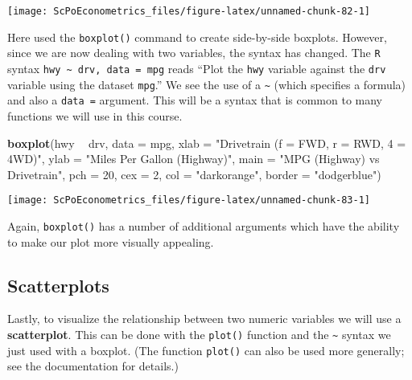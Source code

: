 \documentclass[]{book}
\newenvironment{Shaded}{\begin{snugshade}}{\end{snugshade}}
\newcommand{\DataTypeTok}[1]{\textcolor[rgb]{0.13,0.29,0.53}{#1}}
\newcommand{\DecValTok}[1]{\textcolor[rgb]{0.00,0.00,0.81}{#1}}
\newcommand{\KeywordTok}[1]{\textcolor[rgb]{0.13,0.29,0.53}{\textbf{#1}}}
\newcommand{\NormalTok}[1]{#1}
\newcommand{\OperatorTok}[1]{\textcolor[rgb]{0.81,0.36,0.00}{\textbf{#1}}}
\newcommand{\StringTok}[1]{\textcolor[rgb]{0.31,0.60,0.02}{#1}}
\begin{document}
\begin{center}\texttt{[image: ScPoEconometrics\_files/figure-latex/unnamed-chunk-82-1]} \end{center}

Here used the \texttt{boxplot()} command to create side-by-side boxplots. However, since we are now dealing with two variables, the syntax has changed. The \texttt{R} syntax \texttt{hwy\ \textasciitilde{}\ drv,\ data\ =\ mpg} reads ``Plot the \texttt{hwy} variable against the \texttt{drv} variable using the dataset \texttt{mpg}.'' We see the use of a \texttt{\textasciitilde{}} (which specifies a formula) and also a \texttt{data\ =} argument. This will be a syntax that is common to many functions we will use in this course.

\begin{Shaded}
\begin{Highlighting}[]
\KeywordTok{boxplot}\NormalTok{(hwy }\OperatorTok{~}\StringTok{ }\NormalTok{drv, }\DataTypeTok{data =}\NormalTok{ mpg,}
     \DataTypeTok{xlab   =} \StringTok{"Drivetrain (f = FWD, r = RWD, 4 = 4WD)"}\NormalTok{,}
     \DataTypeTok{ylab   =} \StringTok{"Miles Per Gallon (Highway)"}\NormalTok{,}
     \DataTypeTok{main   =} \StringTok{"MPG (Highway) vs Drivetrain"}\NormalTok{,}
     \DataTypeTok{pch    =} \DecValTok{20}\NormalTok{,}
     \DataTypeTok{cex    =} \DecValTok{2}\NormalTok{,}
     \DataTypeTok{col    =} \StringTok{"darkorange"}\NormalTok{,}
     \DataTypeTok{border =} \StringTok{"dodgerblue"}\NormalTok{)}
\end{Highlighting}
\end{Shaded}

\begin{center}\texttt{[image: ScPoEconometrics\_files/figure-latex/unnamed-chunk-83-1]} \end{center}

Again, \texttt{boxplot()} has a number of additional arguments which have the ability to make our plot more visually appealing.

\hypertarget{scatterplots}{%
\subsection{Scatterplots}\label{scatterplots}}

Lastly, to visualize the relationship between two numeric variables we will use a \textbf{scatterplot}. This can be done with the \texttt{plot()} function and the \texttt{\textasciitilde{}} syntax we just used with a boxplot. (The function \texttt{plot()} can also be used more generally; see the documentation for details.)
\end{document}

